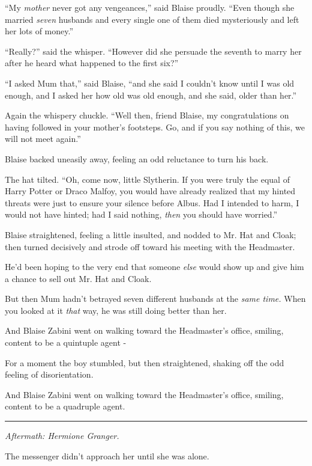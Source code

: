 ``My \emph{mother} never got any vengeances,'' said Blaise proudly. ``Even though she married \emph{seven} husbands and every single one of them died mysteriously and left her lots of money.''

``Really?'' said the whisper. ``However did she persuade the seventh to marry her after he heard what happened to the first six?''

``I asked Mum that,'' said Blaise, ``and she said I couldn't know until I was old enough, and I asked her how old was old enough, and she said, older than her.''

Again the whispery chuckle. ``Well then, friend Blaise, my congratulations on having followed in your mother's footsteps. Go, and if you say nothing of this, we will not meet again.''

Blaise backed uneasily away, feeling an odd reluctance to turn his back.

The hat tilted. ``Oh, come now, little Slytherin. If you were truly the equal of Harry Potter or Draco Malfoy, you would have already realized that my hinted threats were just to ensure your silence before Albus. Had I intended to harm, I would not have hinted; had I said nothing, \emph{then} you should have worried.''

Blaise straightened, feeling a little insulted, and nodded to Mr. Hat and Cloak; then turned decisively and strode off toward his meeting with the Headmaster.

He'd been hoping to the very end that someone \emph{else} would show up and give him a chance to sell out Mr. Hat and Cloak.

But then Mum hadn't betrayed seven different husbands at the \emph{same time.} When you looked at it \emph{that} way, he was still doing better than her.

And Blaise Zabini went on walking toward the Headmaster's office, smiling, content to be a quintuple agent -

For a moment the boy stumbled, but then straightened, shaking off the odd feeling of disorientation.

And Blaise Zabini went on walking toward the Headmaster's office, smiling, content to be a quadruple agent.

\begin{center}\rule{3in}{0.4pt}\end{center}

\emph{Aftermath: Hermione Granger.}

The messenger didn't approach her until she was alone.

